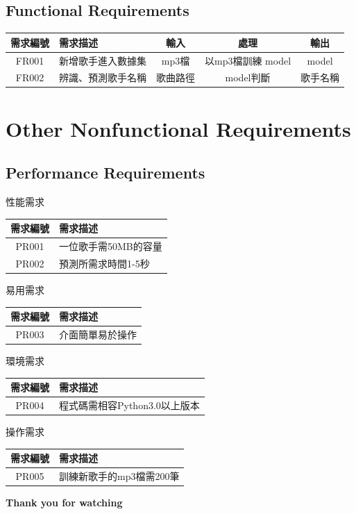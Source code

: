 \documentclass{article}
\begin{document}
\begin{CJK}{UTF8}{bkai}
\subsection{ \Large Functional Requirements}
 \begin{center}
	\begin{tabular}{|c|p{3cm}|c|c|c|}\hline
		需求編號 &  需求描述&輸入&處理&輸出 \\ \hline
		FR001 &  新增歌手進入數據集&mp3檔&以mp3檔訓練 model&model \\ \hline
		FR002 &  辨識、預測歌手名稱&歌曲路徑&model判斷&歌手名稱\\\hline
	\end{tabular}
\end{center}

\section{\huge\bf  \color {blue}  Other Nonfunctional Requirements }
\subsection{ \Large Performance Requirements}
\begin{center}
	性能需求\\
	\begin{tabular}{|c|p{8cm}|}\hline
		需求編號 & 需求描述 \\ \hline
		PR001 &  一位歌手需50MB的容量  \\ \hline
		PR002 & 預測所需求時間1-5秒  \\ \hline
	\end{tabular}
\end{center}
\begin{center}
	易用需求\\
	\begin{tabular}{|c|p{8cm}|}\hline
		需求編號  & 需求描述 \\ \hline
		PR003  &介面簡單易於操作  \\ \hline
	\end{tabular}
\end{center}
\begin{center}
	環境需求\\
	\begin{tabular}{|c|p{8cm}|}\hline
		需求編號 & 需求描述 \\ \hline
		PR004 & 程式碼需相容Python3.0以上版本  \\ \hline
	\end{tabular}
\end{center}
\begin{center}
	操作需求\\
	\begin{tabular}{|c|p{8cm}|}\hline
		需求編號  & 需求描述 \\ \hline
		PR005  &訓練新歌手的mp3檔需200筆  \\ \hline
	\end{tabular}
\end{center}

\newpage
\Huge\bf   Thank you for watching


\end{CJK}
\end{document}
